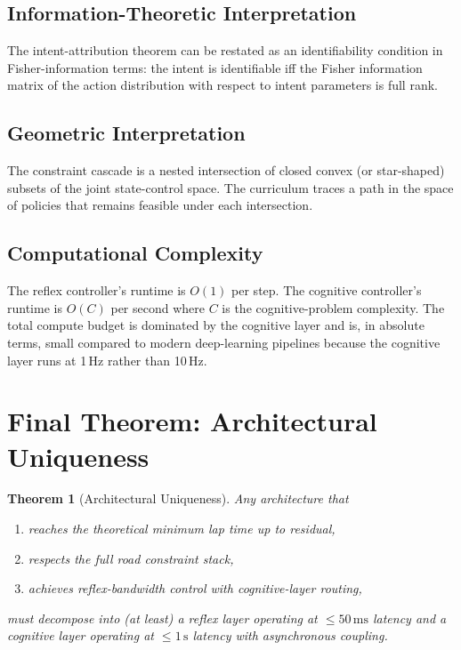 \documentclass[11pt,twocolumn]{article}
\newtheorem{theorem}{Theorem}
\theoremstyle{definition}
\theoremstyle{remark}
\begin{document}
\subsection{Information-Theoretic Interpretation}

The intent-attribution theorem can be restated as an identifiability condition in Fisher-information terms: the intent is identifiable iff the Fisher information matrix of the action distribution with respect to intent parameters is full rank.

\subsection{Geometric Interpretation}

The constraint cascade is a nested intersection of closed convex (or star-shaped) subsets of the joint state-control space. The curriculum traces a path in the space of policies that remains feasible under each intersection.

\subsection{Computational Complexity}

The reflex controller's runtime is $O(1)$ per step. The cognitive controller's runtime is $O(C)$ per second where $C$ is the cognitive-problem complexity. The total compute budget is dominated by the cognitive layer and is, in absolute terms, small compared to modern deep-learning pipelines because the cognitive layer runs at 1\,Hz rather than 10\,Hz.

\section{Final Theorem: Architectural Uniqueness}
\label{app:uniqueness-arch}

\begin{theorem}[Architectural Uniqueness]\label{thm:arch-unique}
Any architecture that
\begin{enumerate}[leftmargin=*,itemsep=2pt]
\item reaches the theoretical minimum lap time up to residual,
\item respects the full road constraint stack,
\item achieves reflex-bandwidth control with cognitive-layer routing,
\end{enumerate}
must decompose into (at least) a reflex layer operating at $\le 50\,\mathrm{ms}$ latency and a cognitive layer operating at $\le 1\,\mathrm{s}$ latency with asynchronous coupling.
\end{theorem}
\end{document}
